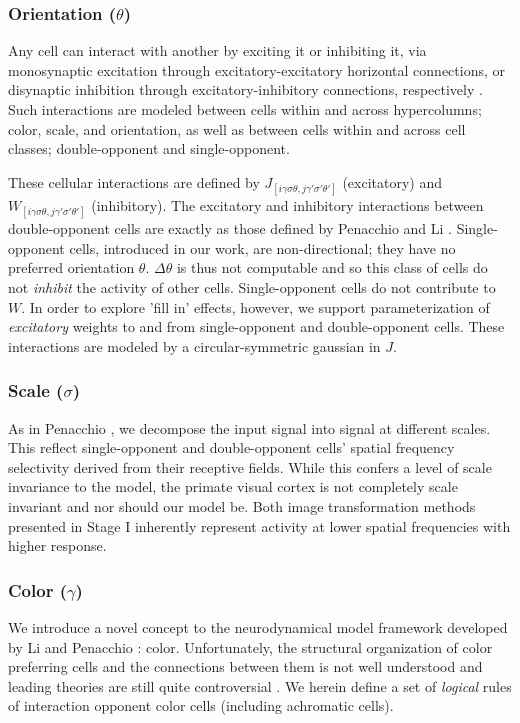 \documentclass[journal,onecolumn]{IEEEtran}
\begin{document}
\subsubsection*{Orientation ($\theta$)}
Any cell can interact with another by exciting it or inhibiting it, via monosynaptic excitation through excitatory-excitatory horizontal connections, or disynaptic inhibition through excitatory-inhibitory connections, respectively \cite{penacchio:2013}. Such interactions are modeled between cells within and across hypercolumns; color, scale, and orientation, as well as between cells within and across cell classes; double-opponent and single-opponent.

These cellular interactions are defined by $J_{[i\gamma\sigma\theta, j\gamma'\sigma'\theta']}$ (excitatory) and $W_{[i\gamma\sigma\theta, j\gamma'\sigma'\theta']}$ (inhibitory). The excitatory and inhibitory interactions between double-opponent cells are exactly as those defined by Penacchio \cite{penacchio:2013} and Li \cite{li:1999}. Single-opponent cells, introduced in our work, are non-directional; they have no preferred orientation $\theta$. $\Delta\theta$ is thus not computable and so this class of cells do not \textit{inhibit} the activity of other cells. Single-opponent cells do not contribute to $W$. In order to explore 'fill in' effects, however, we support parameterization of \textit{excitatory} weights to and from single-opponent and double-opponent cells. These interactions are modeled by a circular-symmetric gaussian in $J$.

\subsubsection*{Scale ($\sigma$)}
As in Penacchio \cite{penacchio:2013}, we decompose the input signal into signal at different scales. This reflect single-opponent and double-opponent cells' spatial frequency selectivity derived from their receptive fields. While this confers a level of scale invariance to the model, the primate visual cortex is not completely scale invariant and nor should our model be. Both image transformation methods presented in Stage I inherently represent activity at lower spatial frequencies with higher response.

\subsubsection*{Color ($\gamma$)}
We introduce a novel concept to the neurodynamical model framework developed by Li \cite{li:1999} and Penacchio \cite{penacchio:2013}: color. Unfortunately, the structural organization of color preferring cells and the connections between them is not well understood and leading theories are still quite controversial \cite{shapley:2011}. We herein define a set of \textit{logical} rules of interaction opponent color cells (including achromatic cells).
\end{document}
